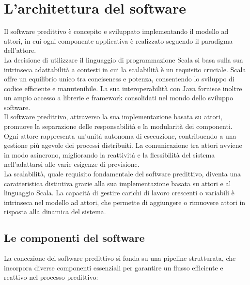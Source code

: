 \section[Architettura]{L'architettura del software}
Il software predittivo è concepito e sviluppato implementando il modello ad attori, in cui ogni componente applicativa è realizzato seguendo il paradigma dell'attore. \\
La decisione di utilizzare il linguaggio di programmazione Scala si basa sulla sua intrinseca adattabilità a contesti in cui la scalabilità è un requisito cruciale.
Scala offre un equilibrio unico tra conciseness e potenza, consentendo lo sviluppo di codice efficiente e manutenibile.
La sua interoperabilità con Java fornisce inoltre un ampio accesso a librerie e framework consolidati nel mondo dello sviluppo software. \\
Il software predittivo, attraverso la sua implementazione basata su attori, promuove la separazione delle responsabilità e la modularità dei componenti.
Ogni attore rappresenta un'unità autonoma di esecuzione, contribuendo a una gestione più agevole dei processi distribuiti.
La comunicazione tra attori avviene in modo asincrono, migliorando la reattività e la flessibilità del sistema nell'adattarsi alle varie esigenze di previsione. \\
La scalabilità, quale requisito fondamentale del software predittivo, diventa una caratteristica distintiva grazie alla sua implementazione basata su attori e al linguaggio Scala.
La capacità di gestire carichi di lavoro crescenti o variabili è intrinseca nel modello ad attori, che permette di aggiungere o rimuovere attori in risposta alla dinamica del sistema.

\subsection[Componenti]{Le componenti del software}
La concezione del software predittivo si fonda su una pipeline strutturata, che incorpora diverse componenti essenziali per garantire un flusso efficiente e reattivo nel processo predittivo:

